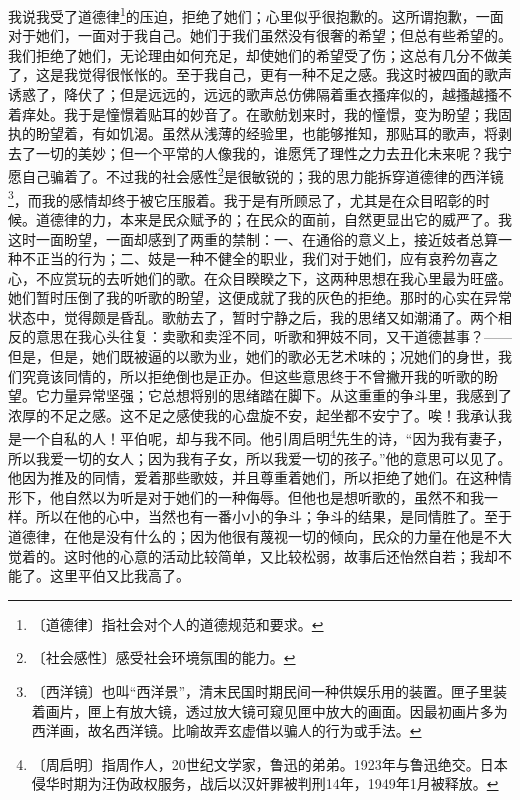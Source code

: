 \documentclass[12pt,UTF-8,openany]{ctexbook}
\begin{document}
\begin{large}
    我说我受了道德律\footnote{〔道德律〕指社会对个人的道德规范和要求。}的压迫，拒绝了她们；心里似乎很抱歉的。这所谓抱歉，一面对于她们，一面对于我自己。她们于我们虽然没有很奢的希望；但总有些希望的。我们拒绝了她们，无论理由如何充足，却使她们的希望受了伤；这总有几分不做美了，这是我觉得很怅怅的。至于我自己，更有一种不足之感。我这时被四面的歌声诱惑了，降伏了；但是远远的，远远的歌声总仿佛隔着重衣搔痒似的，越搔越搔不着痒处。我于是憧憬着贴耳的妙音了。在歌舫划来时，我的憧憬，变为盼望；我固执的盼望着，有如饥渴。虽然从浅薄的经验里，也能够推知，那贴耳的歌声，将剥去了一切的美妙；但一个平常的人像我的，谁愿凭了理性之力去丑化未来呢？我宁愿自己骗着了。不过我的社会感性\footnote{〔社会感性〕感受社会环境氛围的能力。}是很敏锐的；我的思力能拆穿道德律的西洋镜\footnote{〔西洋镜〕也叫“西洋景”，清末民国时期民间一种供娱乐用的装置。匣子里装着画片，匣上有放大镜，透过放大镜可窥见匣中放大的画面。因最初画片多为西洋画，故名西洋镜。比喻故弄玄虚借以骗人的行为或手法。}，而我的感情却终于被它压服着。我于是有所顾忌了，尤其是在众目昭彰的时候。道德律的力，本来是民众赋予的；在民众的面前，自然更显出它的威严了。我这时一面盼望，一面却感到了两重的禁制：一、在通俗的意义上，接近妓者总算一种不正当的行为；二、妓是一种不健全的职业，我们对于她们，应有哀矜勿喜之心，不应赏玩的去听她们的歌。在众目睽睽之下，这两种思想在我心里最为旺盛。她们暂时压倒了我的听歌的盼望，这便成就了我的灰色的拒绝。那时的心实在异常状态中，觉得颇是昏乱。歌舫去了，暂时宁静之后，我的思绪又如潮涌了。两个相反的意思在我心头往复：卖歌和卖淫不同，听歌和狎妓不同，又干道德甚事？——但是，但是，她们既被逼的以歌为业，她们的歌必无艺术味的；况她们的身世，我们究竟该同情的，所以拒绝倒也是正办。但这些意思终于不曾撇开我的听歌的盼望。它力量异常坚强；它总想将别的思绪踏在脚下。从这重重的争斗里，我感到了浓厚的不足之感。这不足之感使我的心盘旋不安，起坐都不安宁了。唉！我承认我是一个自私的人！平伯呢，却与我不同。他引周启明\footnote{〔周启明〕指周作人，20世纪文学家，鲁迅的弟弟。1923年与鲁迅绝交。日本侵华时期为汪伪政权服务，战后以汉奸罪被判刑14年，1949年1月被释放。}先生的诗，“因为我有妻子，所以我爱一切的女人；因为我有子女，所以我爱一切的孩子。”他的意思可以见了。他因为推及的同情，爱着那些歌妓，并且尊重着她们，所以拒绝了她们。在这种情形下，他自然以为听是对于她们的一种侮辱。但他也是想听歌的，虽然不和我一样。所以在他的心中，当然也有一番小小的争斗；争斗的结果，是同情胜了。至于道德律，在他是没有什么的；因为他很有蔑视一切的倾向，民众的力量在他是不大觉着的。这时他的心意的活动比较简单，又比较松弱，故事后还怡然自若；我却不能了。这里平伯又比我高了。
    

\end{large}
\end{document}
